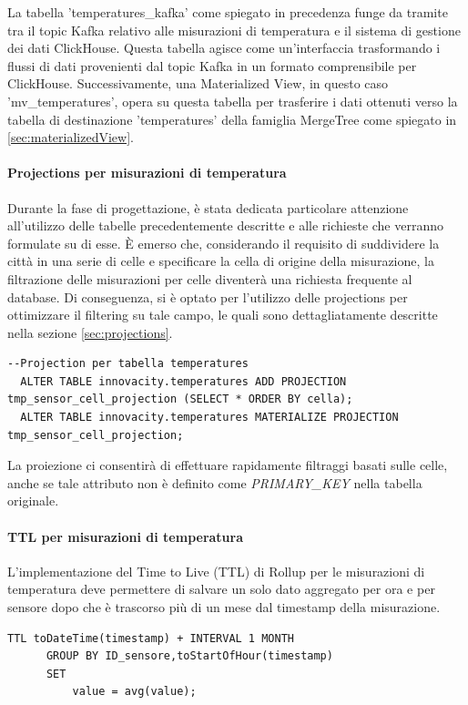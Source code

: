     La tabella 'temperatures\_kafka' come spiegato in precedenza funge da tramite tra il topic Kafka relativo alle misurazioni di temperatura e il sistema di gestione dei dati ClickHouse. Questa tabella agisce come un'interfaccia trasformando i flussi di dati provenienti dal topic Kafka in un formato comprensibile per ClickHouse. Successivamente, una Materialized View, in questo caso 'mv\_temperatures', opera su questa tabella per trasferire i dati ottenuti verso la tabella di destinazione 'temperatures' della famiglia MergeTree come spiegato in \ref{sec:materializedView}.
    
\paragraph{Projections per misurazioni di temperatura} \label{sec:temp_projections}
Durante la fase di progettazione, è stata dedicata particolare attenzione all'utilizzo delle tabelle precedentemente descritte e alle richieste che verranno formulate su di esse. È emerso che, considerando il requisito di suddividere la città in una serie di celle e specificare la cella di origine della misurazione, la filtrazione delle misurazioni per celle diventerà una richiesta frequente al database. Di conseguenza, si è optato per l'utilizzo delle projections per ottimizzare il filtering su tale campo, le quali sono dettagliatamente descritte nella sezione \ref{sec:projections}.
\vspace{0,3cm}
\begin{lstlisting}[caption={implementazione PROJECTION tabella temperatures}, captionpos=b]
  --Projection per tabella temperatures
  ALTER TABLE innovacity.temperatures ADD PROJECTION tmp_sensor_cell_projection (SELECT * ORDER BY cella);
  ALTER TABLE innovacity.temperatures MATERIALIZE PROJECTION tmp_sensor_cell_projection;
\end{lstlisting}
\vspace{0,3cm}
La proiezione ci consentirà di effettuare rapidamente filtraggi basati sulle celle, anche se tale attributo non è definito come \textit{PRIMARY\_KEY} nella tabella originale.
      
  \paragraph{TTL per misurazioni di temperatura} \label{sec:temp_projections}
  L'implementazione del Time to Live (TTL) di Rollup per le misurazioni di temperatura deve permettere di salvare un solo dato aggregato per ora e per sensore dopo che è trascorso più di un mese dal timestamp della misurazione.
  \begin{lstlisting}[caption={implementazione TTL tabella temperatures}, captionpos=b]
    TTL toDateTime(timestamp) + INTERVAL 1 MONTH
      GROUP BY ID_sensore,toStartOfHour(timestamp)
      SET
          value = avg(value);
  \end{lstlisting}

